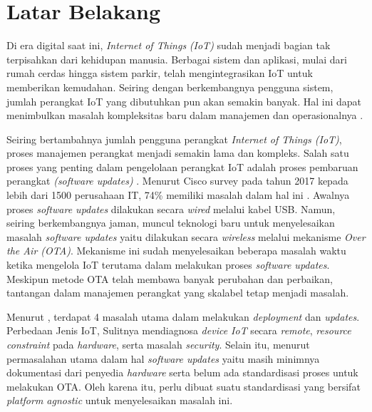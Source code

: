 \section{Latar Belakang}
\label{sec:latar-belakang}

Di era digital saat ini, \textit{Internet of Things} \textit{(IoT)} sudah menjadi bagian tak terpisahkan dari kehidupan manusia. Berbagai sistem dan aplikasi, mulai dari rumah cerdas hingga sistem parkir, telah mengintegrasikan IoT untuk memberikan kemudahan. Seiring dengan berkembangnya pengguna sistem, jumlah perangkat IoT yang dibutuhkan pun akan semakin banyak. Hal ini dapat menimbulkan masalah kompleksitas baru dalam manajemen dan operasionalnya \parencite{IOTSmartCity}.

Seiring bertambahnya jumlah pengguna perangkat \textit{Internet of Things (IoT)}, proses manajemen perangkat menjadi semakin lama dan kompleks. Salah satu proses yang penting dalam pengelolaan perangkat IoT adalah proses pembaruan perangkat \textit{(software updates)} \parencite{OTAKeyPrinciples}. Menurut Cisco survey pada tahun 2017 kepada lebih dari 1500 perusahaan IT, 74\% memiliki masalah dalam hal ini \parencite{RemoteDeployment}. Awalnya proses \textit{software updates} dilakukan secara \textit{wired} melalui kabel USB. Namun, seiring berkembangnya jaman, muncul teknologi baru untuk menyelesaikan masalah \textit{software updates} yaitu dilakukan secara \textit{wireless} melalui mekanisme \textit{Over the Air (OTA)}. Mekanisme ini sudah menyelesaikan beberapa masalah waktu ketika mengelola IoT terutama dalam melakukan proses \textit{software updates}. Meskipun metode OTA telah membawa banyak perubahan dan perbaikan, tantangan dalam manajemen perangkat yang skalabel tetap menjadi masalah. \parencite{ElJaouhari2022}

Menurut \parencite{RemoteDeployment}, terdapat 4 masalah utama dalam melakukan \textit{deployment} dan \textit{updates}. Perbedaan Jenis IoT, Sulitnya mendiagnosa \textit{device IoT} secara \textit{remote}, \textit{resource constraint} pada \textit{hardware}, serta masalah \textit{security}. Selain itu, menurut \parencite{studyovertheair1} permasalahan utama dalam hal \textit{software updates} yaitu masih minimnya dokumentasi dari penyedia \textit{hardware} serta belum ada standardisasi proses untuk melakukan OTA. Oleh karena itu, perlu dibuat suatu standardisasi yang bersifat \textit{platform agnostic} untuk menyelesaikan masalah ini.

